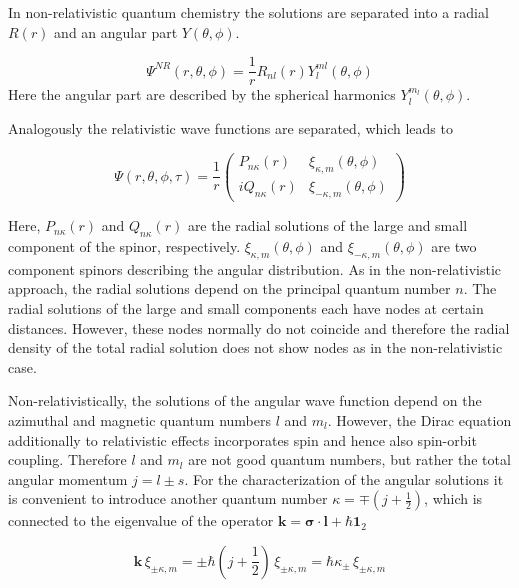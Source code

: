 In non-relativistic quantum chemistry the solutions are separated into a radial
$R(r)$ and an angular part $Y(\theta,\phi)$.

\begin{equation}
\Psi^{NR}(r,\theta,\phi) = \frac1r R_{nl}(r)Y^{ml}_l(\theta,\phi)
\end{equation}
Here the angular part are described by the spherical harmonics
$Y_l^{m_l}(\theta,\phi)$.

Analogously the relativistic wave functions are separated, which leads to

\begin{equation}\label{seprel}
\Psi(r,\theta,\phi,\tau) = \frac1r \left( \begin{array}{rl}
P_{n\kappa}(r)  & \xi_{\kappa,m}(\theta,\phi)\\
iQ_{n\kappa}(r) & \xi_{-\kappa,m}(\theta,\phi)
\end{array}\right)
\end{equation}

Here, $P_{n\kappa}(r)$ and $Q_{n\kappa}(r)$ are the radial solutions of the
large and small component of the spinor, respectively. $\xi_{\kappa,m}(\theta,\phi)$
and $\xi_{-\kappa,m}(\theta,\phi)$ are two component spinors describing the
angular distribution. As in the non-relativistic approach, the radial solutions
depend on the principal quantum number $n$. The radial solutions of the large and
small components each have nodes at certain distances. However, these nodes
normally do not coincide and therefore the radial density of the total radial
solution does not show nodes as in the non-relativistic case.

Non-relativistically, the solutions
of the angular wave function depend on the azimuthal and magnetic quantum numbers
$l$ and $m_l$. However, the Dirac equation additionally to relativistic effects
incorporates spin and hence also spin-orbit coupling. Therefore $l$ and $m_l$ are
not good quantum numbers, but rather the total angular momentum $j=l\pm s$.
For the characterization of the angular solutions it is convenient
to introduce another quantum number $\kappa=\mp(j+\frac12)$, which is connected
to the eigenvalue of the operator
$\mathbf{k}= \mathbf{\sigma}\cdot \mathbf{l} + \hbar \mathbf{1}_2$

\begin{equation}
 \mathbf{k} \, \xi_{\pm \kappa,m} = \pm \hbar (j+\frac12) \, \xi_{\pm \kappa,m}
 = \hbar \kappa_\pm \, \xi_{\pm \kappa,m}
\end{equation}



